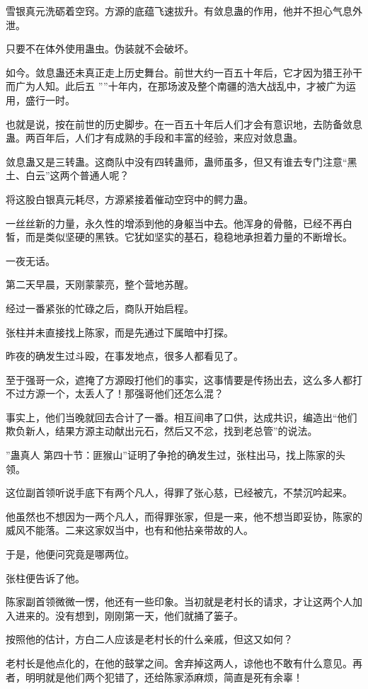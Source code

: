 \begin{this_body}
雪银真元洗砺着空窍。方源的底蕴飞速拔升。有敛息蛊的作用，他并不担心气息外泄。

只要不在体外使用蛊虫。伪装就不会破坏。

如今。敛息蛊还未真正走上历史舞台。前世大约一百五十年后，它才因为猎王孙干而广为人知。此后五 ””十年内，在那场波及整个南疆的浩大战乱中，才被广为运用，盛行一时。

也就是说，按在前世的历史脚步。在一百五十年后人们才会有意识地，去防备敛息蛊。两百年后，人们才有成熟的手段和丰富的经验，来应对敛息蛊。

敛息蛊又是三转蛊。这商队中没有四转蛊师，蛊师虽多，但又有谁去专门注意“黑土、白云”这两个普通人呢？

将这股白银真元耗尽，方源紧接着催动空窍中的鳄力蛊。

一丝丝新的力量，永久性的增添到他的身躯当中去。他浑身的骨骼，已经不再白皙，而是类似坚硬的黑铁。它犹如坚实的基石，稳稳地承担着力量的不断增长。

一夜无话。

第二天早晨，天刚蒙蒙亮，整个营地苏醒。

经过一番紧张的忙碌之后，商队开始启程。

张柱并未直接找上陈家，而是先通过下属暗中打探。

昨夜的确发生过斗殴，在事发地点，很多人都看见了。

至于强哥一众，遮掩了方源殴打他们的事实，这事情要是传扬出去，这么多人都打不过方源一个，太丢人了！那强哥他们还怎么混？

事实上，他们当晚就回去合计了一番。相互间串了口供，达成共识，编造出“他们欺负新人，结果方源主动献出元石，然后又不忿，找到老总管”的说法。

”蛊真人 第四十节：匪猴山”证明了争抢的确发生过，张柱出马，找上陈家的头领。

这位副首领听说手底下有两个凡人，得罪了张心慈，已经被亢，不禁沉吟起来。

他虽然也不想因为一两个凡人，而得罪张家，但是一来，他不想当即妥协，陈家的威风不能落。二来这家奴当中，也有和他拈亲带故的人。

于是，他便问究竟是哪两位。

张柱便告诉了他。

陈家副首领微微一愣，他还有一些印象。当初就是老村长的请求，才让这两个人加入进来的。没有想到，刚刚第一天，他们就捅了篓子。

按照他的估计，方白二人应该是老村长的什么亲戚，但这又如何？

老村长是他点化的，在他的鼓掌之间。舍弃掉这两人，谅他也不敢有什么意见。再者，明明就是他们两个犯错了，还给陈家添麻烦，简直是死有余辜！


\end{this_body}
